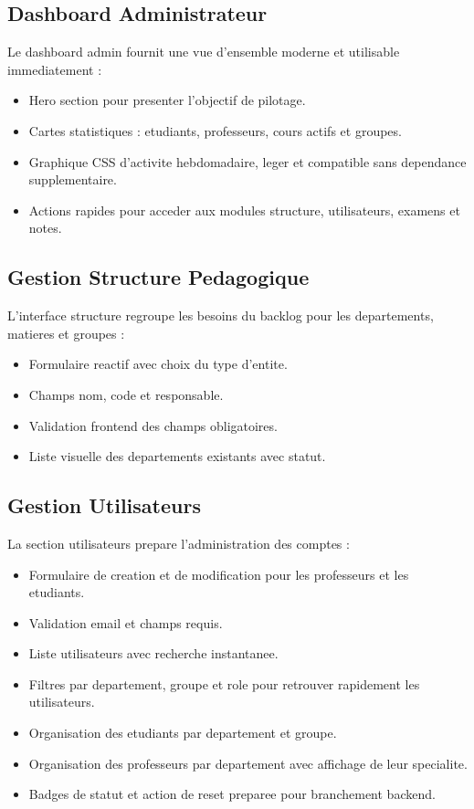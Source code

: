 \documentclass[12pt,a4paper]{report}
\begin{document}
\subsection{Dashboard Administrateur}

Le dashboard admin fournit une vue d'ensemble moderne et utilisable immediatement :

\begin{itemize}[itemsep=0.3em]
    \item Hero section pour presenter l'objectif de pilotage.
    \item Cartes statistiques : etudiants, professeurs, cours actifs et groupes.
    \item Graphique CSS d'activite hebdomadaire, leger et compatible sans dependance supplementaire.
    \item Actions rapides pour acceder aux modules structure, utilisateurs, examens et notes.
\end{itemize}

\subsection{Gestion Structure Pedagogique}

L'interface structure regroupe les besoins du backlog pour les departements, matieres et groupes :

\begin{itemize}[itemsep=0.3em]
    \item Formulaire reactif avec choix du type d'entite.
    \item Champs nom, code et responsable.
    \item Validation frontend des champs obligatoires.
    \item Liste visuelle des departements existants avec statut.
\end{itemize}

\subsection{Gestion Utilisateurs}

La section utilisateurs prepare l'administration des comptes :

\begin{itemize}[itemsep=0.3em]
    \item Formulaire de creation et de modification pour les professeurs et les etudiants.
    \item Validation email et champs requis.
    \item Liste utilisateurs avec recherche instantanee.
    \item Filtres par departement, groupe et role pour retrouver rapidement les utilisateurs.
    \item Organisation des etudiants par departement et groupe.
    \item Organisation des professeurs par departement avec affichage de leur specialite.
    \item Badges de statut et action de reset preparee pour branchement backend.
\end{itemize}
\end{document}
